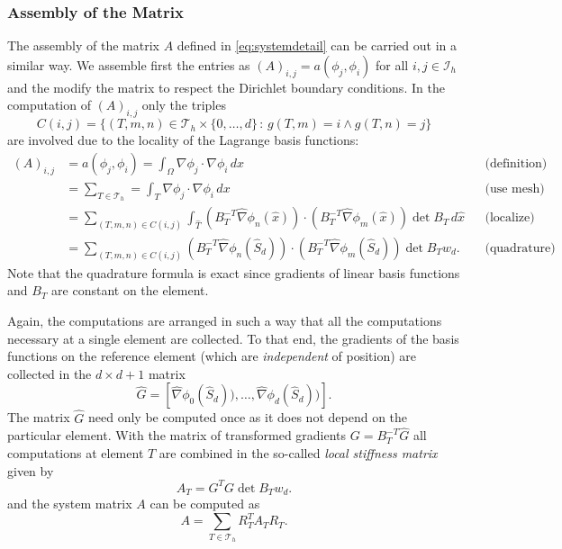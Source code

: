 \documentclass[a4paper,
		     11pt,
		     DIV12,
		     DIVcalc,
		     headings=normal,
		     oneside,
		     bibliography=totoc,
		     headsepline=false,
		     headinclude]{scrartcl}
\begin{document}
\subsubsection*{Assembly of the Matrix}

The assembly of the matrix $A$ defined in \eqref{eq:systemdetail} can be carried
out in a similar way. We assemble first the entries as $(A)_{i,j}=a(\phi_j,\phi_i)$
for all $i,j\in\mathcal{I}_h$ and the modify the matrix to respect the Dirichlet
boundary conditions. In the computation of $(A)_{i,j}$ only the triples
$$C(i,j) = \{(T,m,n)\in\mathcal{T}_h\times\{0,\ldots,d\} \,:\, g(T,m)=i \wedge g(T,n)=j\}$$
are involved due to the locality of the Lagrange basis functions:
\begin{align*}
(A)_{i,j} &= a(\phi_j,\phi_i) = \int_\Omega \nabla \phi_j \cdot \nabla \phi_i \,dx 
&&\text{(definition)}\\
&= \sum_{T\in\mathcal{T}_h} = \int_T \nabla \phi_j \cdot \nabla \phi_i \,dx
&&\text{(use mesh)}\\
&= \sum_{(T,m,n)\in C(i,j)}
\int_{\hat T} (B_T^{-T} \hat\nabla\phi_n(\hat x))\cdot (B_T^{-T} \hat\nabla\phi_m(\hat x))
\det B_T \,d\hat x &&\text{(localize)}\\
&= \sum_{(T,m,n)\in C(i,j)}
(B_T^{-T} \hat\nabla\phi_n(\hat S_d))\cdot (B_T^{-T} \hat\nabla\phi_m(\hat S_d))
\det B_T w_d . &&\text{(quadrature)}
\end{align*}
Note that the quadrature formula is exact since gradients of linear basis functions
and $B_T$ are constant on the element.

Again, the computations are arranged in such a way that all the computations
necessary at a single element are collected. To that end,
the gradients of the basis functions on the reference element (which are {\em independent}
of position) are collected in the $d\times d+1$ matrix
\begin{equation*}
\hat G = \left[\hat\nabla\phi_0(\hat S_d)),\ldots,\hat\nabla\phi_d(\hat S_d))\right] .
\end{equation*}
The matrix $\hat G$ need only be computed once as it does not depend on the
particular element.
With the matrix of transformed gradients $G=B_T^{-T} \hat G$
all computations at element $T$ are 
combined in the so-called {\em local stiffness matrix} given by
\begin{equation*}
A_T = G^T G \det B_T w_d .
\end{equation*}
and the system matrix $A$ can be computed as
\begin{equation}
A =  \sum_{T\in\mathcal{T}_h} R_T^T A_T R_T .
\label{eq:matrixassembly}
\end{equation}
\end{document}
